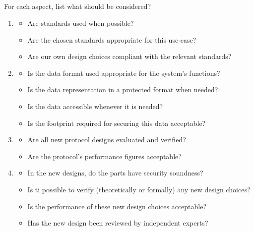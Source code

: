 \begin{questions}
\begin{parts}
  \part{} For each aspect, list what should be considered?
    \begin{solution}
      \begin{enumerate}[noitemsep]
      \item
        \begin{itemize}[noitemsep]
        \item Are standards used when possible?
        \item Are the chosen standards appropriate for this use-case?
        \item Are our own design choices compliant with the relevant standards?
        \end{itemize}
      \item
        \begin{itemize}[noitemsep]
        \item Is the data format used appropriate for the system's functions?
        \item Is the data representation in a protected format when needed?
        \item Is the data accessible whenever it is needed?
        \item Is the footprint required for securing this data acceptable?
        \end{itemize}
      \item
        \begin{itemize}[noitemsep]
        \item Are all new protocol designs evaluated and verified?
        \item Are the protocol's performance figures acceptable?
        \end{itemize}
      \item
        \begin{itemize}[noitemsep]
        \item In the new designs, do the parts have security soundness?
        \item Is ti possible to verify (theoretically or formally) any new design choices?
        \item Is the performance of these new design choices acceptable?
        \item Has the new design been reviewed by independent experts?
        \end{itemize}
      \end{enumerate}
    \end{solution}
  \end{parts}


\end{questions}
